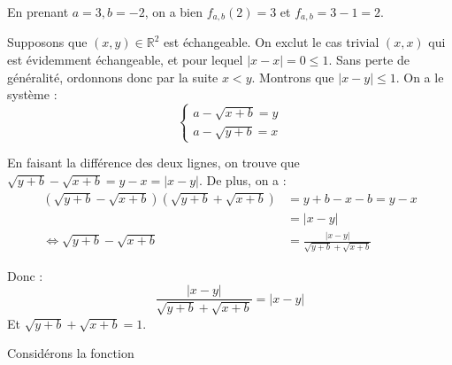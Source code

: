 \documentclass[]{../../homework}
\begin{document}
	\subproblem
	En prenant $a = 3, b=-2$, on a bien $f_{a,b}(2) = 3$ et $f_{a,b} = 3-1 = 2$.
	\subproblem
	
	Supposons que $(x,y) \in \mathbb R^2$ est échangeable. On exclut le cas trivial $(x,x)$ qui est évidemment échangeable, et pour lequel $|x-x| = 0 \leq 1$. Sans perte de généralité, ordonnons donc par la suite $x < y$. Montrons que $|x-y| \leq 1$. On a le système :
	\begin{equation*}
		\begin{cases}
			a - \sqrt{x+b} = y \\
			a - \sqrt{y+b} = x
		\end{cases}
	\end{equation*}
	
	En faisant la différence des deux lignes, on trouve que $\sqrt{y+b} - \sqrt{x+b} = y-x = |x-y|$. De plus, on a :
	\begin{equation*}
		\begin{split}
		(\sqrt{y+b} - \sqrt{x+b})(\sqrt{y+b} + \sqrt{x+b}) &= y + b - x - b  = y-x \\
		 &= |x-y| \\
		 \iff \sqrt{y+b} - \sqrt{x+b} &= \frac {|x-y|}{\sqrt{y+b} + \sqrt{x+b}} 
		 \end{split}
	\end{equation*}
	
	Donc : $$\frac {|x-y|}{\sqrt{y+b} + \sqrt{x+b}} = |x-y|$$
	Et $\sqrt{y+b} + \sqrt{x+b} = 1$.
	
	Considérons la fonction
\end{document}
